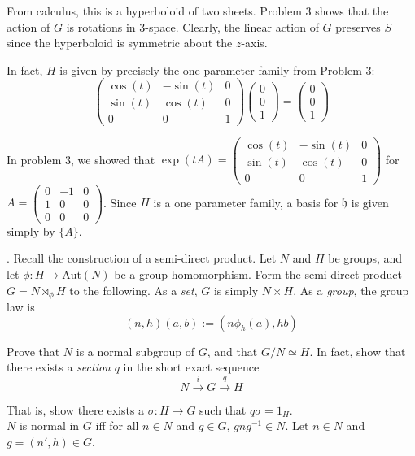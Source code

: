 \documentclass[11pt]{article}
\newcommand{\Aut}{\text{Aut}}
\newcommand{\lra}{\longrightarrow}
\begin{document}
		From calculus, this is a hyperboloid of two sheets. Problem 3 shows that the action of $G$ is rotations in 3-space. Clearly, the linear action of $G$ preserves $S$ since the hyperboloid is symmetric about the $z$-axis. 

		In fact, $H$ is given by precisely the one-parameter family from Problem 3: 
		\[\begin{pmatrix}
			\cos(t) & -\sin(t) & 0\\
			\sin(t) & \cos(t) & 0\\
			0 & 0 & 1
		\end{pmatrix} \begin{pmatrix}
			0\\
			0\\
			1
		\end{pmatrix} = \begin{pmatrix}
			0\\ 
			0\\
			1
		\end{pmatrix}\]
		
		In problem 3, we showed that $\exp(tA) = \begin{pmatrix}
			\cos(t) & -\sin(t) & 0\\
			\sin(t) & \cos(t) & 0\\
			0 & 0 & 1
		\end{pmatrix}$ for $A = \begin{pmatrix}
			0 & -1 & 0\\
			1 & 0 & 0\\
			0 & 0 & 0
		\end{pmatrix}$. Since $H$ is a one parameter family, a basis for $\mathfrak{h}$ is given simply by $\{A\}$.

	\color{black}

.  Recall the construction of a semi-direct product.  Let $N$ and $H$ be groups, and let $\phi:  H \lra\Aut(N)$ be a group homomorphism.  Form the semi-direct product $G = N\rtimes_{\phi} H$ to the following.  As a \emph{set}, $G$ is simply $N \times H$.  As a \emph{group}, the group law is
\[(n,h)(a,b) := (n\phi_{h}(a),hb)\]

Prove that $N$ is a normal subgroup of $G$, and that $G/N \simeq H$.  In fact, show that there exists a \emph{section} $q$ in the short exact sequence
\[N \xrightarrow{i} G \xrightarrow{q} H\]

That is, show there exists a $\sigma : H \lra G$ such that $q\sigma = 1_{H}$.  \\

	\color{blue}
		$N$ is normal in $G$ iff for all $n \in N$ and $g \in G$, $gng^{-1} \in N$. Let $n \in N$ and $g = (n', h) \in G$. 
\end{document}
